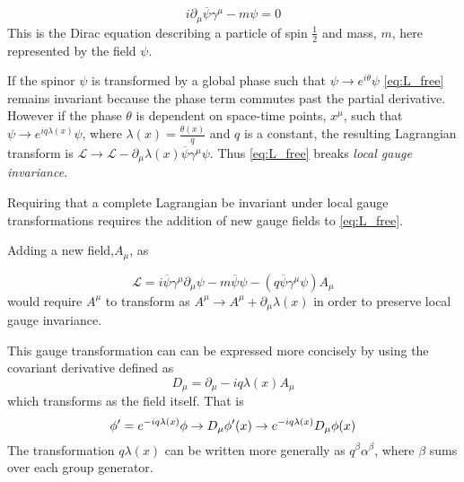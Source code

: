 \begin{equation}
 i\partial_{\mu}\overline{\psi}\gamma^{\mu} -  m\psi = 0
\end{equation}
This is the Dirac equation describing a particle of spin $\frac{1}{2}$ and mass, $m$, here represented by the field $\psi$. 

If the spinor $\psi$ is transformed by a global phase such that $\psi \to e^{i\theta}\psi$ \autoref{eq:L_free} remains invariant because the phase term commutes past the partial derivative. However if the phase $\theta$ is dependent on space-time points, $x^{\mu}$, such that $\psi \to e^{iq\lambda(x)}\psi$, where $\lambda(x) = \frac{\theta(x)}{q}$ and $q$ is a constant, the resulting Lagrangian transform is $\mathcal{L} \to \mathcal{L} - \partial_{\mu}\lambda(x)\overline{\psi}\gamma^{\mu}\psi$. Thus \autoref{eq:L_free} breaks \emph{local gauge invariance}.

Requiring that a complete Lagrangian be invariant under local gauge transformations requires the addition of new gauge fields to \autoref{eq:L_free}.

Adding a new field,$A_{\mu}$, as

\begin{equation}
  \label{eq:L_free}
  \mathcal{L} = i\overline{\psi}\gamma^{\mu}\partial_{\mu}\psi - m\overline{\psi}\psi - (q\overline{\psi}\gamma^{\mu}\psi)A_{\mu}
\end{equation}
would require $A^{\mu}$ to transform as $A^{\mu} \to A^{\mu} + \partial_{\mu}\lambda(x)$ in order to preserve local gauge invariance.

This gauge transformation can can be expressed more concisely by using the covariant derivative defined as
\begin{equation}
 D_{\mu} = \partial_{\mu} - iq\lambda(x)A_{\mu}
\end{equation}
which transforms as the field itself.
That is %
\begin{equation}
  \phi^\prime  = e^{-iq\lambda(x)}\phi\\
  \rightarrow D_{\mu}\phi^\prime(x) \to e^{-iq\lambda(x)}D_{\mu}\phi(x)
\end{equation}
The transformation $q\lambda(x)$ can be written more generally as $q^{\beta}\alpha^{\beta}$, where $\beta$ sums over each group generator.

